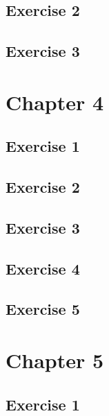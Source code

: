 \documentclass[a4paper,12pt,oneside]{book}
\begin{document}
\hypertarget{exercise-2}{%
\subsection{Exercise 2}\label{exercise-2}}

\hypertarget{exercise-3}{%
\subsection{Exercise 3}\label{exercise-3}}

\hypertarget{chapter-4}{%
\section{Chapter 4}\label{chapter-4}}

\hypertarget{exercise-1-1}{%
\subsection{Exercise 1}\label{exercise-1-1}}

\hypertarget{exercise-2-1}{%
\subsection{Exercise 2}\label{exercise-2-1}}

\hypertarget{exercise-3-1}{%
\subsection{Exercise 3}\label{exercise-3-1}}

\hypertarget{exercise-4}{%
\subsection{Exercise 4}\label{exercise-4}}

\hypertarget{exercise-5}{%
\subsection{Exercise 5}\label{exercise-5}}

\hypertarget{chapter-5}{%
\section{Chapter 5}\label{chapter-5}}

\hypertarget{exercise-1-2}{%
\subsection{Exercise 1}\label{exercise-1-2}}
\end{document}
